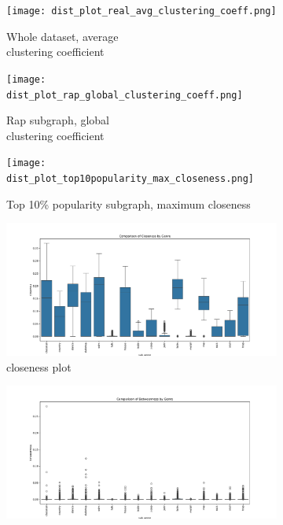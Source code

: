 \begin{figure}
    \centering
    \begin{subfigure}{.33\textwidth}
      \centering
      \captionsetup{justification=centering}
      \texttt{[image: dist\_plot\_real\_avg\_clustering\_coeff.png]}
      \caption{Whole dataset, average \\ clustering coefficient}
      \label{fig:hist1}
    \end{subfigure}%
    \begin{subfigure}{.33\textwidth}
      \centering
      \captionsetup{justification=centering}
      \texttt{[image: dist\_plot\_rap\_global\_clustering\_coeff.png]}
      \caption{Rap subgraph, global \\ clustering coefficient}
      \label{fig:hist2}
    \end{subfigure}
    \begin{subfigure}{.33\textwidth}
      \centering
      \captionsetup{justification=centering}
      \texttt{[image: dist\_plot\_top10popularity\_max\_closeness.png]}
      \caption{Top 10\% popularity subgraph, maximum closeness}
      \label{fig:hist3}
    \end{subfigure}
    \begin{subfigure}{.33\textwidth}
      \centering
      \captionsetup{justification=centering}
      \includegraphics[width=\linewidth]{../../results/sub_genre/closeness.pdf}  %
      \caption{closeness plot}
      \label{fig:hist4}
    \end{subfigure}
    \begin{subfigure}{.33\textwidth}
      \centering
      \captionsetup{justification=centering}
      \includegraphics[width=\linewidth]{../../results/sub_genre/betweenness.pdf}  %

\end{subfigure}
\end{figure}

